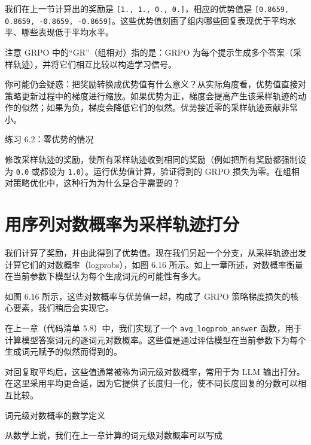 我们在上一节计算出的奖励是 \texttt{[1., 1., 0., 0.]}，相应的优势值是 \texttt{[0.8659, 0.8659, -0.8659, -0.8659]}。这些优势值刻画了组内哪些回复表现优于平均水平、哪些表现低于平均水平。

\begin{myWarning}{注意}
 GRPO 中的“GR”（组相对）指的是：GRPO 为每个提示生成多个答案（采样轨迹），并将它们相互比较以构造学习信号。\end{myWarning}

你可能仍会疑惑：把奖励转换成优势值有什么意义？从实际角度看，优势值直接对策略更新过程中的梯度进行缩放。如果优势为正，梯度会提高产生该采样轨迹的动作的似然；如果为负，梯度会降低它们的似然。优势接近零的采样轨迹贡献非常小。

\begin{mySidebar}{练习 6.2：零优势的情况}

修改采样轨迹的奖励，使所有采样轨迹收到相同的奖励（例如把所有奖励都强制设为 \texttt{0.0} 或都设为 \texttt{1.0}）。运行优势值计算，验证得到的 GRPO 损失为零。在组相对策略优化中，这种行为为什么是合乎需要的？

\end{mySidebar}

\section{用序列对数概率为采样轨迹打分}

我们计算了奖励，并由此得到了优势值。现在我们另起一个分支，从采样轨迹出发计算它们的对数概率（logprobs），如图 6.16 所示。如上一章所述，对数概率衡量在当前参数下模型认为每个生成词元的可能性有多大。


如图 6.16 所示，这些对数概率与优势值一起，构成了 GRPO 策略梯度损失的核心要素，我们稍后会实现它。

在上一章（代码清单 5.8）中，我们实现了一个 \texttt{avg\_logprob\_answer} 函数，用于计算模型答案词元的逐词元对数概率。这些值是通过评估模型在当前参数下为每个生成词元赋予的似然而得到的。

对回复取平均后，这些值通常被称为词元级对数概率，常用于为 LLM 输出打分。在这里采用平均更合适，因为它提供了长度归一化，使不同长度回复的分数可以相互比较。

\begin{mySidebar}{词元级对数概率的数学定义}

从数学上说，我们在上一章计算的词元级对数概率可以写成

\end{mySidebar}

